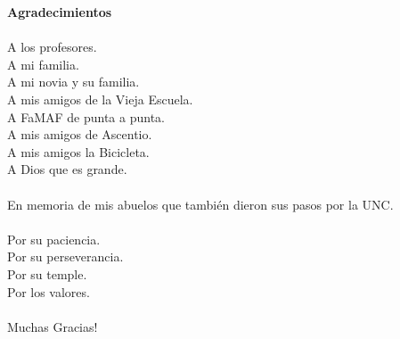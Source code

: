 {\huge \textbf{Agradecimientos}}\\
\\
A los profesores.\\
A mi familia.\\
A mi novia y su familia.\\
A mis amigos de la Vieja Escuela.\\
A FaMAF de punta a punta.\\
A mis amigos de Ascentio.\\
A mis amigos la Bicicleta.\\ 
A Dios que es grande.\\
\\
En memoria de mis abuelos que tambi\'en dieron sus pasos por la UNC.\\\\
\noindent
Por su paciencia.\\
Por su perseverancia.\\
Por su temple.\\
Por los valores.\\
\\
Muchas Gracias!


\newpage
